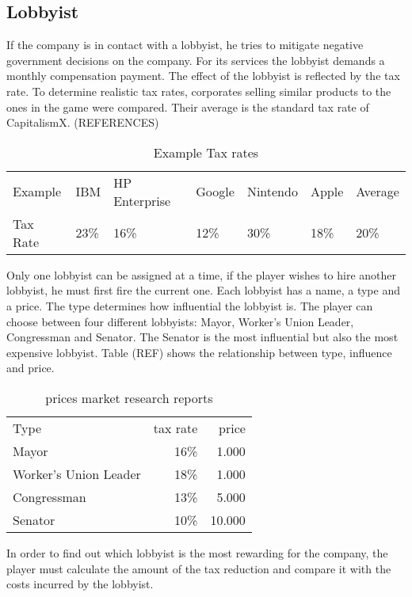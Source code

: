 \subsection{Lobbyist}
If the company is in contact with a lobbyist, he tries to mitigate negative government decisions on the company. For its services the lobbyist demands a monthly compensation payment. The effect of the lobbyist is reflected by the tax rate. 
To determine realistic tax rates, corporates selling similar products to the ones in the game were compared. Their average is the standard tax rate of CapitalismX. (REFERENCES)

\begin{table}[]
\centering
\begin{tabular}{|l|l|l|l|l|l|l|}
\hline
Example & IBM & HP Enterprise & Google & Nintendo & Apple & Average \\
Tax Rate & 23\% & 16\% & 12\% & 30\% & 18\% & 20\% \\ \hline
\end{tabular}
\caption{Example Tax rates}
\label{Example_Tax}
\end{table}

Only one lobbyist can be assigned at a time, if the player wishes to hire another lobbyist, he must first fire the current one. Each lobbyist has a name, a type and a price. The type determines how influential the lobbyist is. The player can choose between four different lobbyists: Mayor, Worker’s Union Leader, Congressman and Senator. The Senator is the most influential but also the most expensive lobbyist. Table (REF) shows the relationship between type, influence and price. 

\begin{table}[ht]
\centering
\begin{tabular}{|l|r|r|}
\hline
Type                    & tax rate  & price \\
Mayor                   & 16\%      & 1.000     \\
Worker's Union Leader   & 18\%      & 1.000     \\
Congressman             & 13\%      & 5.000     \\
Senator                 & 10\%      & 10.000     \\
\hline
\end{tabular}
\caption{prices market research reports}
\label{MR_report_price}
\end{table}

In order to find out which lobbyist is the most rewarding for the company, the player must calculate the amount of the tax reduction and compare it with the costs incurred by the lobbyist.
 



 




